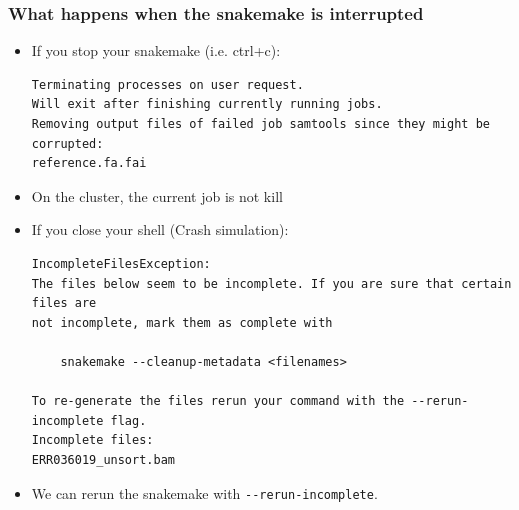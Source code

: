\documentclass{beamer}
\begin{document}
\begin{frame}[fragile]
    \frametitle{What happens when the snakemake is interrupted}
    \begin{itemize}
        \item If you stop your snakemake (i.e. ctrl+c):
        \begin{lstlisting}[language={}]
Terminating processes on user request.
Will exit after finishing currently running jobs.
Removing output files of failed job samtools since they might be corrupted:
reference.fa.fai
        \end{lstlisting}
        \item On the cluster, the current job is not kill
        \item If you close your shell (Crash simulation):
        \begin{lstlisting}[language={}]
IncompleteFilesException:
The files below seem to be incomplete. If you are sure that certain files are 
not incomplete, mark them as complete with

    snakemake --cleanup-metadata <filenames>

To re-generate the files rerun your command with the --rerun-incomplete flag.
Incomplete files:
ERR036019_unsort.bam
        \end{lstlisting}
        \item We can rerun the snakemake with \lstinline[basicstyle=\small\ttfamily]{--rerun-incomplete}.
    \end{itemize}
\end{frame}
\end{document}
